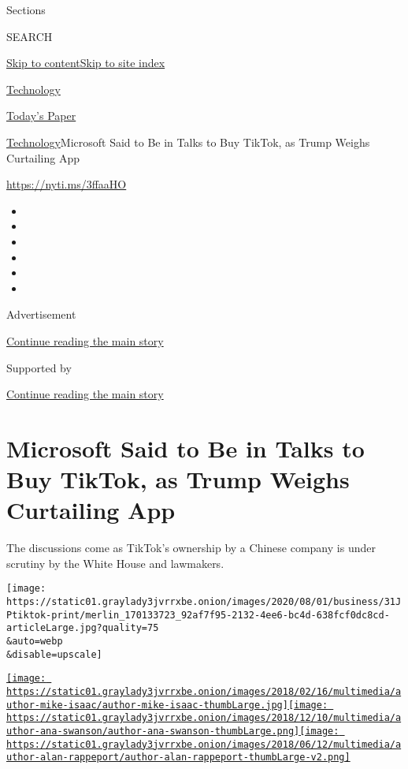 Sections

SEARCH

\protect\hyperlink{site-content}{Skip to
content}\protect\hyperlink{site-index}{Skip to site index}

\href{https://www.nytimes3xbfgragh.onion/section/technology}{Technology}

\href{https://myaccount.nytimes3xbfgragh.onion/auth/login?response_type=cookie\&client_id=vi}{}

\href{https://www.nytimes3xbfgragh.onion/section/todayspaper}{Today's
Paper}

\href{/section/technology}{Technology}\textbar{}Microsoft Said to Be in
Talks to Buy TikTok, as Trump Weighs Curtailing App

\url{https://nyti.ms/3ffaaHO}

\begin{itemize}
\item
\item
\item
\item
\item
\item
\end{itemize}

Advertisement

\protect\hyperlink{after-top}{Continue reading the main story}

Supported by

\protect\hyperlink{after-sponsor}{Continue reading the main story}

\hypertarget{microsoft-said-to-be-in-talks-to-buy-tiktok-as-trump-weighs-curtailing-app}{%
\section{Microsoft Said to Be in Talks to Buy TikTok, as Trump Weighs
Curtailing
App}\label{microsoft-said-to-be-in-talks-to-buy-tiktok-as-trump-weighs-curtailing-app}}

The discussions come as TikTok's ownership by a Chinese company is under
scrutiny by the White House and lawmakers.

\texttt{[image: https://static01.graylady3jvrrxbe.onion/images/2020/08/01/business/31JPtiktok-print/merlin\_170133723\_92af7f95-2132-4ee6-bc4d-638fcf0dc8cd-articleLarge.jpg?quality=75\\\&auto=webp\\\&disable=upscale]}

\href{https://www.nytimes3xbfgragh.onion/by/mike-isaac}{\texttt{[image: https://static01.graylady3jvrrxbe.onion/images/2018/02/16/multimedia/author-mike-isaac/author-mike-isaac-thumbLarge.jpg]}}\href{https://www.nytimes3xbfgragh.onion/by/ana-swanson}{\texttt{[image: https://static01.graylady3jvrrxbe.onion/images/2018/12/10/multimedia/author-ana-swanson/author-ana-swanson-thumbLarge.png]}}\href{https://www.nytimes3xbfgragh.onion/by/alan-rappeport}{\texttt{[image: https://static01.graylady3jvrrxbe.onion/images/2018/06/12/multimedia/author-alan-rappeport/author-alan-rappeport-thumbLarge-v2.png]}}

